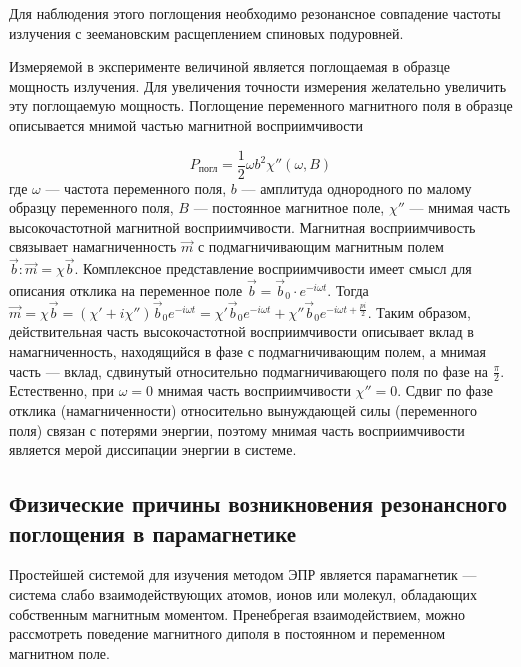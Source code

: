 \documentclass[a4paper, 12pt]{article}%
\begin{document}
Для наблюдения этого поглощения необходимо резонансное совпадение частоты излучения с
зеемановским расщеплением спиновых подуровней.

Измеряемой в эксперименте величиной является поглощаемая в образце мощность
излучения. Для увеличения точности измерения желательно увеличить эту поглощаемую
мощность.
\newpage
Поглощение переменного магнитного поля в образце описывается мнимой частью магнитной
восприимчивости

\begin{equation}
P_{\text{погл}} = \frac{1}{2}\omega b^2 \chi''(\omega, B)
\end{equation}
где $\omega$ --- частота переменного поля, $b$ --- амплитуда однородного по малому образцу переменного поля, $B$ --- постоянное магнитное поле, $\chi''$ ---  мнимая часть высокочастотной магнитной восприимчивости. Магнитная восприимчивость связывает намагниченность $\vec{m}$ с подмагничивающим магнитным полем $\vec{b} : \vec{m} =\chi \vec{b}$. Комплексное представление восприимчивости имеет смысл для описания отклика на переменное поле $\vec{b}=\vec{b}_0 \cdot e^{-i \omega t}$. Тогда $\vec{m} =\chi \vec{b} = (\chi' + i \chi'')\vec{b}_0 e^{-i \omega t}=\chi' \vec{b}_0 e^{-i \omega t} + \chi'' \vec{b}_0 e^{-i \omega t + \frac{pi}{2}}$. Таким образом, действительная часть высокочастотной восприимчивости описывает вклад в
намагниченность, находящийся в фазе с подмагничивающим полем, а мнимая часть — вклад, сдвинутый
относительно подмагничивающего поля по фазе на $\frac{\pi}{2}$. Естественно, при $\omega=0$ мнимая часть восприимчивости $\chi'' = 0$. Сдвиг по фазе отклика (намагниченности) относительно вынуждающей силы
(переменного поля) связан с потерями энергии, поэтому мнимая часть восприимчивости является мерой
диссипации энергии в системе.
\subsection*{Физические причины возникновения резонансного поглощения в
парамагнетике}
Простейшей системой для изучения методом ЭПР является парамагнетик — система слабо
взаимодействующих атомов, ионов или молекул, обладающих собственным магнитным
моментом. Пренебрегая взаимодействием, можно рассмотреть поведение магнитного диполя
в постоянном и переменном магнитном поле. 
\end{document}
